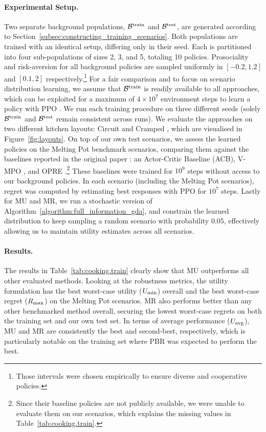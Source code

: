 




\paragraph{Experimental Setup.} Two separate background populations, $\mathcal{B}^\text{train}$ and $\mathcal{B}^\text{test}$, are generated according to Section~\ref{subsec:constructing_training_scenarios}. Both populations are trained with an identical setup, differing only in their seed. Each is partitioned into four sub-populations of sizes 2, 3, and 5, totaling 10 policies. Prosociality and risk-aversion for all background policies are sampled uniformly in $[-0.2, 1.2]$ and $[0.1,2]$ respectively.\footnote{Those intervals were chosen empirically to ensure diverse and cooperative policies.}
For a fair comparison and to focus on scenario distribution learning, we assume that $\mathcal{B}^\text{train}$ is readily available to all approaches, which can be exploited for a maximum of $4 \times 10^7$ environment steps to learn a policy with PPO \citep{schulman_proximal_policy_optimization_2017}. We run each training procedure on three different seeds (solely $\mathcal{B}^\text{train}$ and $\mathcal{B}^\text{test}$ remain consistent across runs). We evaluate the approaches on two different kitchen layouts: Circuit and Cramped \citep{agapiou_melting_pot_2_2023}, which are visualised in Figure~\ref{fig:layouts}. 
On top of our own test scenarios, we assess the learned policies on the Melting Pot benchmark scenarios, comparing them against the baselines reported in the original paper \citep{agapiou_melting_pot_2_2023}: an Actor-Critic Baseline (ACB), V-MPO \citep{song_vmpo_on_policy_2019}, and OPRE \citep{vezhnevets_options_responses_grounding_2020}.\footnote{Since their baseline policies are not publicly available, we were unable to evaluate them on our scenarios, which explains the missing values in Table~\ref{tab:cooking.train}.} These baselines were trained for $10^9$ steps without access to our background policies. In each scenario (including the Melting Pot scenarios), regret was computed by estimating best responses with PPO for $10^7$ steps. Lastly for MU and MR, we run a stochastic version of Algorithm~\ref{algorithm:full_information_gda}, and constrain the learned distribution to keep sampling a random scenario with probability $0.05$, effectively allowing us to maintain utility estimates across all scenarios. 


\paragraph{Results.} The results in Table~\ref{tab:cooking.train} clearly show that MU outperforms all other evaluated methods. Looking at the robustness metrics, the utility formulation has the best worst-case utility ($U_\text{min}$) overall and the best worst-case regret ($R_\text{max}$) on the Melting Pot scenarios. MR also performs better than any other benchmarked method overall, securing the lowest worst-case regrets on both the training set and our own test set. In terms of average performance ($U_\text{avg}$), MU and MR are consistently the best and second-best, respectively, which is particularly notable on the training set where PBR was expected to perform the best.

